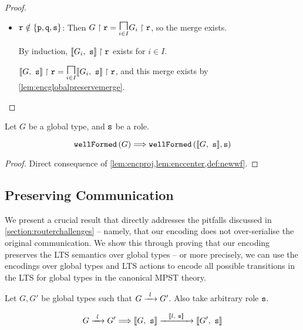 \begin{proof}
\begin{enumerate}
\begin{itemize}
\begin{itemize}
\item ${\mathtt{r}} \notin \{{\mathtt{p}},{\mathtt{q}},{\mathtt{s}}\}$:
Then $\proj{G}{r} = \underset{i \in I}{\MERGEOP}\proj{G_i}{r}$,
so the merge exists.

By induction, ${\llbracket {G_i},~{\mathtt{s}} \rrbracket} \upharpoonright {\mathtt{r}}$ exists for $i \in I$.

$\proj{\enc{G}{s}}{r} = 
	\underset{i \in I}{\MERGEOP}\proj{\enc{G_i}{s}}{r}$,
and this merge exists by \cref{lem:encglobalpreservemerge}.

\end{itemize} %

\end{itemize} %

\end{enumerate} %

\end{proof}

\begin{theorem}
Let $G$ be a global type, and ${\mathtt{s}}$ be a role.

\[
\textnormal{\texttt{wellFormed}}\left(G\right) \Longrightarrow \textnormal{\texttt{wellFormed}}\left(\llbracket {G},~{\mathtt{s}} \rrbracket, {\mathtt{s}}\right)
\]

\label{th:encwf}
\end{theorem}

\begin{proof}
Direct consequence of \cref{lem:encproj,lem:enccenter,def:newwf}.
\end{proof}

\subsection{Preserving Communication}
\label{subsection:encodepreservecomm}

We present a crucial result that directly addresses 
the pitfalls discussed in \cref{section:routerchallenges} --
namely, that our encoding does not over-serialise the
original communication.
We show this through proving that our encoding preserves
the LTS semantics over global types -- or more precisely,
we can use the encodings over global types and LTS actions
to encode all possible transitions in the LTS for
global types in the canonical MPST theory.

\begin{theorem}
Let $G, G'$ be global types
such that $\treduce{G}{G'}{l}$.
Also take arbitrary role ${\mathtt{s}}$.

\[
\treduce{G}{G'}{l}
	\Longrightarrow
\treducelong{\enc{G}{s}}{\enc{G'}{s}}{\enc{l}{s}}
\]

\end{theorem}

